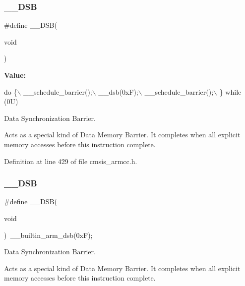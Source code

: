 \subsubsection{\texorpdfstring{\+\_\+\+\_\+\+D\+SB}{\_\_DSB}\hspace{0.1cm}{\footnotesize\ttfamily [1/2]}}
{\footnotesize\ttfamily \#define \+\_\+\+\_\+\+D\+SB(\begin{DoxyParamCaption}\item[{}]{void }\end{DoxyParamCaption})}

{\bfseries Value\+:}
\begin{DoxyCode}
\textcolor{keywordflow}{do} \{\(\backslash\)
                   \_\_schedule\_barrier();\(\backslash\)
                   \_\_dsb(0xF);\(\backslash\)
                   \_\_schedule\_barrier();\(\backslash\)
                \} \textcolor{keywordflow}{while} (0U)
\end{DoxyCode}


Data Synchronization Barrier. 

Acts as a special kind of Data Memory Barrier. It completes when all explicit memory accesses before this instruction complete. 

Definition at line 429 of file cmsis\+\_\+armcc.\+h.

\mbox{\label{group___c_m_s_i_s___core___instruction_interface_ga067d257a2b34565410acefb5afef2203}} 
\subsubsection{\texorpdfstring{\+\_\+\+\_\+\+D\+SB}{\_\_DSB}\hspace{0.1cm}{\footnotesize\ttfamily [2/2]}}
{\footnotesize\ttfamily \#define \+\_\+\+\_\+\+D\+SB(\begin{DoxyParamCaption}\item[{}]{void }\end{DoxyParamCaption})~\+\_\+\+\_\+builtin\+\_\+arm\+\_\+dsb(0x\+F);}



Data Synchronization Barrier. 

Acts as a special kind of Data Memory Barrier. It completes when all explicit memory accesses before this instruction complete. 

